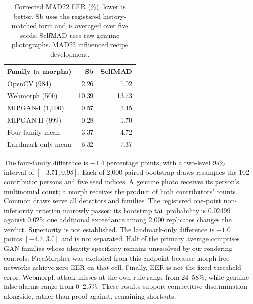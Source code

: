 \begin{table}[t]
\centering\small
\caption{Corrected MAD22 EER (\%), lower is better. Sb uses the registered history-matched form and is averaged over five seeds. SelfMAD uses raw genuine photographs. MAD22 influenced recipe development.}
\label{tab:mad22_results}
\begin{tabular}{lrr}
\toprule
Family ($n$ morphs) & Sb & SelfMAD \\
\midrule
OpenCV (984) & 2.26 & 1.02 \\
Webmorph (500) & 10.39 & 13.73 \\
MIPGAN-I (1,000) & 0.57 & 2.45 \\
MIPGAN-II (999) & 0.28 & 1.70 \\
\midrule
Four-family mean & 3.37 & 4.72 \\
Landmark-only mean & 6.32 & 7.37 \\
\bottomrule
\end{tabular}
\end{table}

The four-family difference is $-1.4$ percentage points, with a two-level 95\% interval of $[-3.51,0.98]$. Each of 2,000 paired bootstrap draws resamples the 102 contributor persons and five seed indices. A genuine photo receives its person's multinomial count; a morph receives the product of both contributors' counts. Common draws serve all detectors and families. The registered one-point non-inferiority criterion narrowly passes: its bootstrap tail probability is 0.02499 against 0.025; one additional exceedance among 2,000 replicates changes the verdict. Superiority is not established. The landmark-only difference is $-1.0$ points $[-4.7,3.0]$ and is not separated. Half of the primary average comprises GAN families whose identity specificity remains unresolved by our rendering controls. FaceMorpher was excluded from this endpoint because morph-free networks achieve zero EER on that cell. Finally, EER is not the fixed-threshold error: Webmorph attack misses at the own rule range from 24--58\%, while genuine false alarms range from 0--2.5\%. These results support competitive discrimination alongside, rather than proof against, remaining shortcuts.

